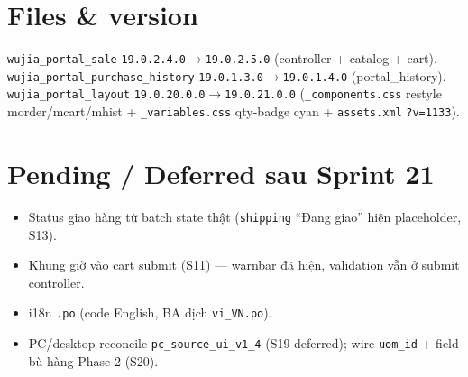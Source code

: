\section{Files \& version}

\texttt{wujia\_portal\_sale} \texttt{19.0.2.4.0}\(\rightarrow\)\texttt{19.0.2.5.0} (controller +
catalog + cart). \texttt{wujia\_portal\_purchase\_history}
\texttt{19.0.1.3.0}\(\rightarrow\)\texttt{19.0.1.4.0} (portal\_history). \texttt{wujia\_portal\_layout}
\texttt{19.0.20.0.0}\(\rightarrow\)\texttt{19.0.21.0.0} (\texttt{\_components.css} restyle morder/mcart/mhist
+ \texttt{\_variables.css} qty-badge cyan + \texttt{assets.xml} \texttt{?v=1133}).

\section{Pending / Deferred sau Sprint 21}

\begin{itemize}
  \item Status giao hàng từ batch state thật (\texttt{shipping} ``Đang giao'' hiện placeholder, S13).
  \item Khung giờ vào cart submit (S11) --- warnbar đã hiện, validation vẫn ở submit controller.
  \item i18n \texttt{.po} (code English, BA dịch \texttt{vi\_VN.po}).
  \item PC/desktop reconcile \texttt{pc\_source\_ui\_v1\_4} (S19 deferred); wire \texttt{uom\_id}
        + field bù hàng Phase 2 (S20).
\end{itemize}

